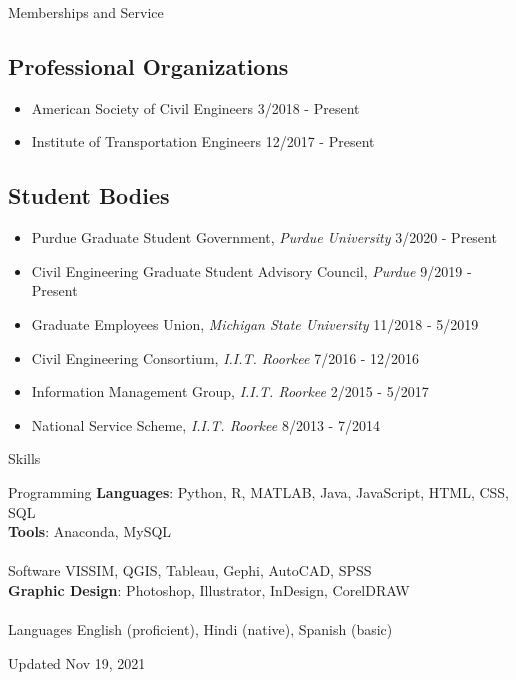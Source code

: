 \documentclass{res} %
\begin{document}
    \begin{rSection}{Memberships and Service}
        \subsection*{Professional Organizations}
        \begin{itemize}
            \item American Society of Civil Engineers \hfill 3/2018 - Present
            \item Institute of Transportation Engineers \hfill 12/2017 - Present
        \end{itemize}
        \subsection*{Student Bodies}
        \begin{itemize}
            \item Purdue Graduate Student Government, \textit{Purdue University} \hfill 3/2020 - Present
            \item Civil Engineering Graduate Student Advisory Council, \textit{Purdue} \hfill 9/2019 - Present
            \item Graduate Employees Union, \textit{Michigan State University} \hfill 11/2018 - 5/2019
            \item Civil Engineering Consortium, \textit{I.I.T. Roorkee} \hfill 7/2016 - 12/2016
            \item Information Management Group, \textit{I.I.T. Roorkee} \hfill 2/2015 - 5/2017
            \item National Service Scheme, \textit{I.I.T. Roorkee} \hfill 8/2013 - 7/2014
        \end{itemize}
    \end{rSection}

    \begin{rSection}{Skills}
        \begin{tabbing}
            Programming \hspace*{0.5cm} \= \textbf{Languages}: Python, R, MATLAB, Java, JavaScript, HTML, CSS, SQL
            \\ \> \textbf{Tools}: Anaconda, MySQL \\
            \\ Software
            \> VISSIM, QGIS, Tableau, Gephi, AutoCAD, SPSS
            \\ \> \textbf{Graphic Design}: Photoshop, Illustrator, InDesign, CorelDRAW \\
            \\ Languages \> English (proficient), Hindi (native), Spanish (basic)
        \end{tabbing}
    \end{rSection}

    \vspace*{\fill}
    \centering Updated Nov 19, 2021
\end{document}
